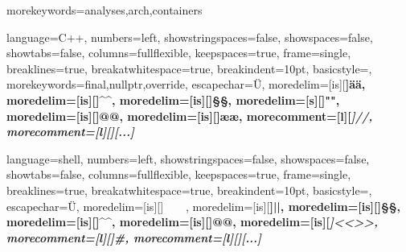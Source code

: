 \clearpairofpagestyles




\ihead*{\Ifthispageodd{\headmark}{\parttitle}}
\ohead*{\Ifthispageodd{\sectiontitle}{}}
\ofoot*{\\[-3mm]~\pagemark}


%
%

\graphicspath{{PIC/}}


%
%

\makeglossaries


%
%


{
  morekeywords={analyses,arch,containers}
}

{
  language=C++,
  numbers=left,
  showstringspaces=false,
  showspaces=false,
  showtabs=false,
  columns=fullflexible,
  keepspaces=true,
  frame=single,
  breaklines=true,
  breakatwhitespace=true,
  breakindent=10pt,
  basicstyle=\ttfamily\footnotesize,
  morekeywords={final,nullptr,override},
  escapechar=Ü,
  moredelim=[is][\bfseries\color{purple}]{ä}{ä},
  moredelim=[is][\color{darkgreen}]{^}{^},
  moredelim=[is][\color{orange}]{§}{§},
  moredelim=[s][\color{red}]{"}{"},
  moredelim=[is][\color{blue}]{@}{@},
  moredelim=[is][\color{purple}]{æ}{æ},
  morecomment=[l][\itshape\color{gray}]{//},
  morecomment=[l][\itshape\color{gray}]{[...]}
}

{
  language=shell,
  numbers=left,
  showstringspaces=false,
  showspaces=false,
  showtabs=false,
  columns=fullflexible,
  keepspaces=true,
  frame=single,
  breaklines=true,
  breakatwhitespace=true,
  breakindent=10pt,
  basicstyle=\ttfamily\footnotesize,
  escapechar=Ü,
  moredelim=[is][\color{black}]{~~}{~~},
  moredelim=[is][\bfseries\color{blue}]{|}{|},
  moredelim=[is][\bfseries\color{green}]{§}{§},
  moredelim=[is][\color{darkgreen}]{^}{^},
  moredelim=[is][\bfseries\underbar]{@}{@},
  moredelim=[is][\itshape]{<<}{>>},
  morecomment=[l][\itshape\color{gray}]{\#},
  morecomment=[l][\itshape\color{gray}]{[...]}
}

